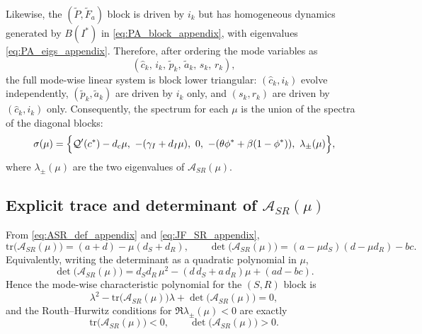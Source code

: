 \documentclass[pdflatex,sn-mathphys-ay]{sn-jnl}
\theoremstyle{thmstyleone}
\theoremstyle{definition}
\theoremstyle{remark}
\begin{document}
\begin{appendices}
Likewise, the $(\tilde P,\tilde F_a)$ block is driven by $i_k$ but has homogeneous dynamics generated by $B(I^*)$ in \eqref{eq:PA_block_appendix}, with eigenvalues \eqref{eq:PA_eigs_appendix}.  Therefore, after ordering the mode variables as
\[
(\hat c_k,\, i_k,\, \tilde p_k,\, \tilde a_k,\, s_k,\, r_k),
\]
the full mode-wise linear system is block lower triangular: $(\hat c_k,i_k)$ evolve independently, $(\tilde p_k,\tilde a_k)$ are driven by $i_k$ only, and $(s_k,r_k)$ are driven by $(\hat c_k,i_k)$ only.  Consequently, the spectrum for each $\mu$ is the union of the spectra of the diagonal blocks:
\begin{equation}
\label{eq:spectrum_union_appendix}
\sigma(\mu)=\Bigl\{\mathcal Q'(c^*)-d_c\mu,\ -(\gamma_I+d_I\mu),\ 0,\ -(\theta\phi^*+\beta(1-\phi^*)),\ \lambda_\pm(\mu)\Bigr\},
\end{equation}
where $\lambda_\pm(\mu)$ are the two eigenvalues of $\mathcal A_{SR}(\mu)$.

\subsection{Explicit trace and determinant of \texorpdfstring{$\mathcal A_{SR}(\mu)$}{A\_SR(mu)}}
From \eqref{eq:ASR_def_appendix} and \eqref{eq:JF_SR_appendix},
\begin{equation}
\label{eq:trace_det_appendix}
\mathrm{tr}\bigl(\mathcal A_{SR}(\mu)\bigr)=(a+d)-\mu(d_S+d_R),
\qquad
\det\bigl(\mathcal A_{SR}(\mu)\bigr)=(a-\mu d_S)(d-\mu d_R)-bc.
\end{equation}
Equivalently, writing the determinant as a quadratic polynomial in $\mu$,
\begin{equation}
\label{eq:det_quadratic_appendix}
\det\bigl(\mathcal A_{SR}(\mu)\bigr)
=d_S d_R\,\mu^2-(d\,d_S+a\,d_R)\mu+(ad-bc).
\end{equation}
Hence the mode-wise characteristic polynomial for the $(S,R)$ block is
\begin{equation}
\label{eq:charpoly_SR_appendix}
\lambda^2-\mathrm{tr}\bigl(\mathcal A_{SR}(\mu)\bigr)\lambda+\det\bigl(\mathcal A_{SR}(\mu)\bigr)=0,
\end{equation}
and the Routh--Hurwitz conditions for $\Re\lambda_\pm(\mu)<0$ are exactly
\[
\mathrm{tr}\bigl(\mathcal A_{SR}(\mu)\bigr)<0,
\qquad
\det\bigl(\mathcal A_{SR}(\mu)\bigr)>0.
\]


\end{appendices}
\end{document}
